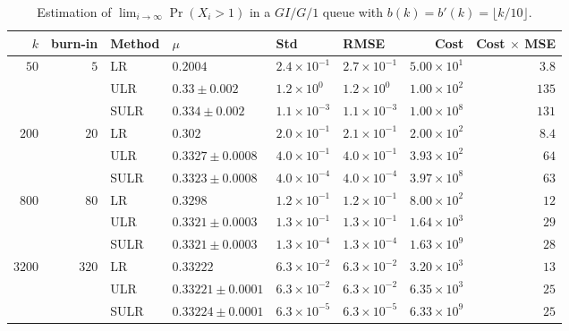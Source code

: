 \documentclass[a4paper,11pt]{article}
\begin{document}
\begin{table}
\caption{Estimation of \(\lim_{i\rightarrow\infty}\Pr(X_{i}>1)\) in a \(GI/G/1\) queue with \(b(k)=b'(k)=\lfloor k/10\rfloor\).}
\begin{small}
\begin{tabular}{rrllllrr}\hline
$k$ &  burn-in & Method  & $\mu$ & Std & RMSE & Cost& Cost $\times$ MSE\\ \hline
$50$&$5 $&LR & $0.2004$ & $2.4\times10^{-1}$ & $2.7\times10^{-1}$ & $5.00\times10^1$ & $3.8$\\
& &ULR & $0.33 \pm 0.002$ & $1.2\times10^0$ & $1.2\times10^0$ & $1.00\times10^2$ & $135$\\
& &SULR & $0.334 \pm 0.002$ & $1.1\times10^{-3}$ & $1.1\times10^{-3}$ & $1.00\times10^8$ & $131$\\
$200$&$20 $&LR & $0.302$ & $2.0\times10^{-1}$ & $2.1\times10^{-1}$ & $2.00\times10^2$ & $8.4$\\
& &ULR & $0.3327 \pm 0.0008$ & $4.0\times10^{-1}$ & $4.0\times10^{-1}$ & $3.93\times10^2$ & $64$\\
& &SULR & $0.3323 \pm 0.0008$ & $4.0\times10^{-4}$ & $4.0\times10^{-4}$ & $3.97\times10^8$ & $63$\\
$800$&$80 $&LR & $0.3298$ & $1.2\times10^{-1}$ & $1.2\times10^{-1}$ & $8.00\times10^2$ & $12$\\
& &ULR & $0.3321 \pm 0.0003$ & $1.3\times10^{-1}$ & $1.3\times10^{-1}$ & $1.64\times10^3$ & $29$\\
& &SULR & $0.3321 \pm 0.0003$ & $1.3\times10^{-4}$ & $1.3\times10^{-4}$ & $1.63\times10^9$ & $28$\\
$3200$&$320 $&LR & $0.33222$ & $6.3\times10^{-2}$ & $6.3\times10^{-2}$ & $3.20\times10^3$ & $13$\\
& &ULR & $0.33221 \pm 0.0001$ & $6.3\times10^{-2}$ & $6.3\times10^{-2}$ & $6.35\times10^3$ & $25$\\
& &SULR & $0.33224 \pm 0.0001$ & $6.3\times10^{-5}$ & $6.3\times10^{-5}$ & $6.33\times10^9$ & $25$\\
\hline\end{tabular}
\end{small}
\label{tab:GG0.1}
\end{table}
\end{document}
